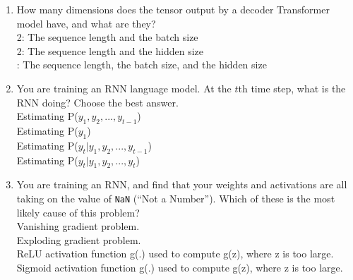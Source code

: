 \begin{enumerate}
    \item How many dimensions does the tensor output by a decoder Transformer model have, and what are they? \\ 
        \hspace{1cm}\choice{} 2: The sequence length and the batch size \\ 
        \hspace{1cm}\choice{} 2: The sequence length and the hidden size \\ 
        \hspace{1cm}: The sequence length, the batch size, and the hidden size \\ 
        \solution{}
    \item You are training an RNN language model. At the $t$th time step, what is the RNN doing? Choose the best answer. \\ 
        \hspace{1cm}\choice{}  Estimating P($y_{1}, y_2, ..., y_{t-1}$) \\ 
        \hspace{1cm}\choice{}  Estimating P($y_1$) \\ 
        \hspace{1cm}\checkmark  Estimating P($y_t | y_1, y_2, ..., y_{t-1}$) \\ 
        \hspace{1cm}\choice{}  Estimating P($y_t | y_1, y_2, ..., y_t$) \\ 
    \solution{}
    
    \item You are training an RNN, and find that your weights and activations are all taking on the value of \texttt{NaN} (``Not a Number''). Which of these is the most likely cause of this problem? \\ 
        \hspace{1cm}\choice{} Vanishing gradient problem. \\ 
        \hspace{1cm}\checkmark Exploding gradient problem. \\ 
        \hspace{1cm}\choice{} ReLU activation function g(.) used to compute g(z), where z is too large. \\ 
        \hspace{1cm}\choice{} Sigmoid activation function g(.) used to compute g(z), where z is too large. \\ 
        \solution{}


\end{enumerate}
